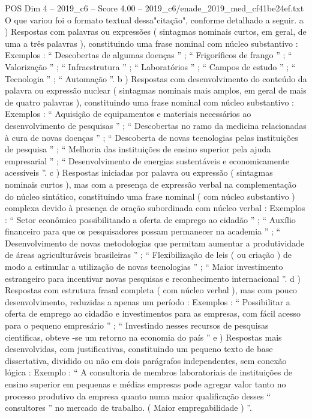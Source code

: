 \begin{textsample}{POS Dim 4 – 2019\_c6 – Score 4.00 – 2019\_c6/enade\_2019\_med\_cf41be24ef.txt}
O que variou foi o formato textual dessa"citação", conforme detalhado a seguir. a ) Respostas com palavras ou expressões ( sintagmas nominais curtos, em geral, de uma a três palavras ), constituindo uma frase nominal com núcleo substantivo : Exemplos : “ Descobertas de algumas doenças ” ; “ Frigoríficos de frango ” ; “ Valorização ” ; “ Infraestrutura ” ; “ Laboratórios ” ; “ Campos de estudo ” ; “ Tecnologia ” ; “ Automação ”. b ) Respostas com desenvolvimento do conteúdo da palavra ou expressão nuclear ( sintagmas nominais mais amplos, em geral de mais de quatro palavras ), constituindo uma frase nominal com núcleo substantivo : Exemplos : “ Aquisição de equipamentos e materiais necessários ao desenvolvimento de pesquisas ” ; “ Descobertas no ramo da medicina relacionadas à cura de novas doenças ” ; “ Descoberta de novas tecnologias pelas instituições de pesquisa ” ; “ Melhoria das instituições de ensino superior pela ajuda empresarial ” ; “ Desenvolvimento de energias sustentáveis e economicamente acessíveis ”. c ) Respostas iniciadas por palavra ou expressão ( sintagmas nominais curtos ), mas com a presença de expressão verbal na complementação do núcleo sintático, constituindo uma frase nominal ( com núcleo substantivo ) complexa devido à presença de oração subordinada com núcleo verbal : Exemplos : “ Setor econômico possibilitando a oferta de emprego ao cidadão ” ; “ Auxílio financeiro para que os pesquisadores possam permanecer na academia ” ; “ Desenvolvimento de novas metodologias que permitam aumentar a produtividade de áreas agriculturáveis brasileiras ” ; “ Flexibilização de leis ( ou criação ) de modo a estimular a utilização de novas tecnologias ” ; “ Maior investimento estrangeiro para incentivar novas pesquisas e reconhecimento internacional ”. d ) Respostas com estrutura frasal completa ( com núcleo verbal ), mas com pouco desenvolvimento, reduzidas a apenas um período : Exemplos : “ Possibilitar a oferta de emprego ao cidadão e investimentos para as empresas, com fácil acesso para o pequeno empresário ” ; “ Investindo nesses recursos de pesquisas cientificas, obteve -se um retorno na economia do país ” e ) Respostas mais desenvolvidas, com justificativas, constituindo um pequeno texto de base dissertativa, dividido ou não em dois parágrafos independentes, sem conexão lógica : Exemplo : “ A consultoria de membros laboratoriais de instituições de ensino superior em pequenas e médias empresas pode agregar valor tanto no processo produtivo da empresa quanto numa maior qualificação desses “ consultores ” no mercado de trabalho. ( Maior empregabilidade ) ”.

\end{textsample}
